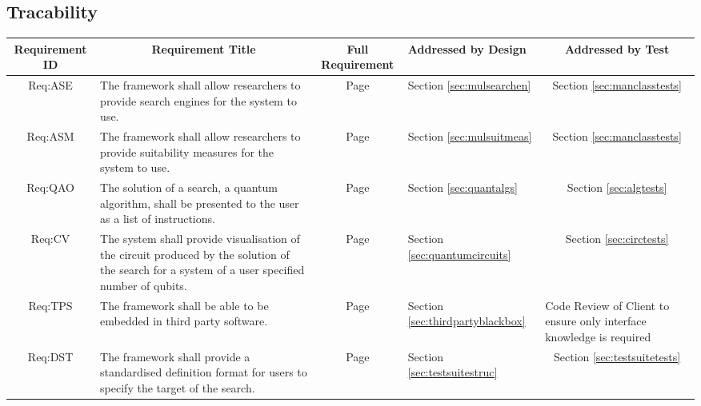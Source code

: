 \clearpage
\begin{landscape}
\section{Tracability}
\label{sec:tracability}

\centering
\noindent\begin{longtable}{|c|m{10cm}|c|m{3cm}|m{3cm}|}
\hline
\textbf{Requirement ID} &
\multicolumn{1}{c|}{\textbf{Requirement Title}} &
\textbf{Full Requirement} &
\textbf{Addressed by Design} &
\multicolumn{1}{c|}{\textbf{Addressed by Test}} \\ \hline

Req:ASE &
The framework shall allow researchers to provide search engines for the system to use. &
Page \pageref{sec:reqase} &
Section \ref{sec:mulsearchen} &
\multicolumn{1}{c|}{Section \ref{sec:manclasstests}}\\ \hline

Req:ASM &
The framework shall allow researchers to provide suitability measures for the system to use. &
Page \pageref{sec:reqasm} &
Section \ref{sec:mulsuitmeas} &
\multicolumn{1}{c|}{Section \ref{sec:manclasstests}}\\ \hline

Req:QAO &
The solution of a search, a quantum algorithm, shall be presented to the user as a list of instructions. &
Page \pageref{sec:reqqao} &
Section \ref{sec:quantalgs} &
\multicolumn{1}{c|}{Section \ref{sec:algtests}} \\ \hline

Req:CV &
The system shall provide visualisation of the circuit produced by the solution of the search for a system of a user specified number of qubits. &
Page \pageref{sec:reqcv} &
Section \ref{sec:quantumcircuits} &
\multicolumn{1}{c|}{Section \ref{sec:circtests}} \\ \hline

Req:TPS &
The framework shall be able to be embedded in third party software. &
Page \pageref{sec:reqtps} &
Section \ref{sec:thirdpartyblackbox} &
Code Review of Client to ensure only interface knowledge is required\\ \hline

Req:DST &
The framework shall provide a standardised definition format for users to specify the target of the search. &
Page \pageref{sec:reqdst} &
Section \ref{sec:testsuitestruc} &
\multicolumn{1}{c|}{Section \ref{sec:testsuitetests}} \\ \hline


\end{longtable}
\end{landscape}
